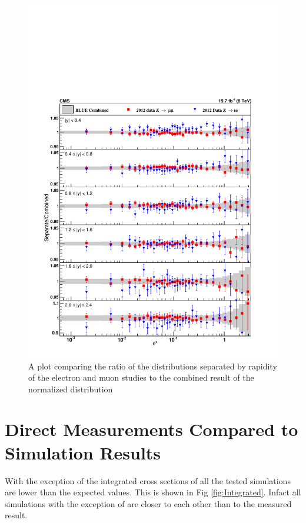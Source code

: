 \begin{figure}
    \centering
    \includegraphics[width=\linewidth]{figures/Results/BlueTwoDNorm.pdf}
    \caption{A plot comparing the ratio of the \phistar distributions separated by rapidity of the electron and muon studies to the \BLUE combined result of the normalized distribution}
    \label{fig:BlueTwoDNorm}
\end{figure}


\section{Direct Measurements Compared to Simulation Results}
With the exception of \RESBOS the integrated cross sections of all the tested simulations are lower than the expected values. This is shown in Fig \ref{fig:Integrated}. Infact all simulations with the exception of \RESBOS are closer to each other than to the measured result.

